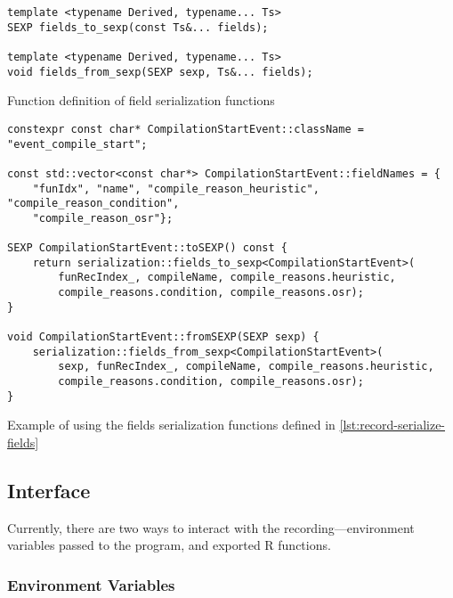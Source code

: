 \begin{listing}
	\begin{verbatim}
template <typename Derived, typename... Ts>
SEXP fields_to_sexp(const Ts&... fields);

template <typename Derived, typename... Ts>
void fields_from_sexp(SEXP sexp, Ts&... fields);
  \end{verbatim}
	\caption{Function definition of field serialization functions}\label{lst:record-serialize-fields}
\end{listing}

\begin{listing}
	\begin{verbatim}
constexpr const char* CompilationStartEvent::className = "event_compile_start";

const std::vector<const char*> CompilationStartEvent::fieldNames = {
    "funIdx", "name", "compile_reason_heuristic", "compile_reason_condition",
    "compile_reason_osr"};

SEXP CompilationStartEvent::toSEXP() const {
    return serialization::fields_to_sexp<CompilationStartEvent>(
        funRecIndex_, compileName, compile_reasons.heuristic,
        compile_reasons.condition, compile_reasons.osr);
}

void CompilationStartEvent::fromSEXP(SEXP sexp) {
    serialization::fields_from_sexp<CompilationStartEvent>(
        sexp, funRecIndex_, compileName, compile_reasons.heuristic,
        compile_reasons.condition, compile_reasons.osr);
}
  \end{verbatim}
	\caption{Example of using the fields serialization functions defined in \ref{lst:record-serialize-fields}}\label{lst:record-serialize-compstart}
\end{listing}

\subsection{Interface}

Currently, there are two ways to interact with the recording---environment variables passed to the program, and exported R functions.

\subsubsection*{Environment Variables}

